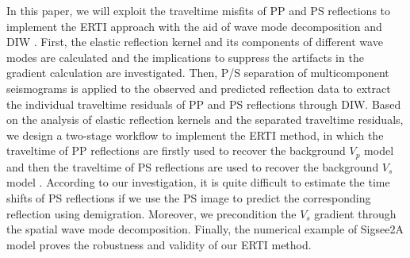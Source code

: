 


In this paper,   
we will exploit the traveltime misfits of PP and PS reflections to implement the ERTI
approach with the aid
of wave mode decomposition and DIW \cite[]{Hale2013}.
First, 
the elastic reflection kernel and its components of different wave modes are
calculated and the implications to suppress the artifacts in the gradient calculation
are investigated.
Then, P/S separation of multicomponent seismograms is applied to the observed and predicted reflection data 
to extract the individual traveltime residuals of PP and PS reflections through DIW. 
Based on the analysis of elastic reflection kernels and the separated traveltime residuals, 
we design a two-stage workflow to implement
the ERTI method,
in which the traveltime of PP reflections are firstly used to recover the background
$V_p$ model and then the traveltime of PS reflections are used to recover the background $V_s$ model
.
According to our investigation, it is quite difficult to estimate the time shifts of PS reflections if we
use the PS image to predict the corresponding reflection using demigration.
Moreover, we precondition the $V_s$ gradient through the spatial wave mode
decomposition.
Finally, the numerical example of Sigsee2A model proves the robustness and validity of our
ERTI method.
